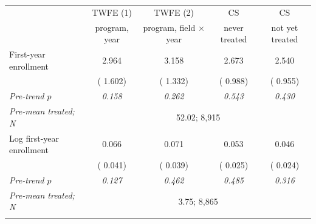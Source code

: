 \begin{tabular}{lcccc}
\toprule
 & TWFE (1) & TWFE (2) & CS & CS \\
 & program, year & program, field \(\times\) year & never treated & not yet treated \\
\midrule
First-year enrollment &   2.964\sym{*} &   3.158\sym{**} &   2.673\sym{***} &   2.540\sym{***} \\
 & ( 1.602) & ( 1.332) & ( 0.988) & ( 0.955) \\
\quad \textit{Pre-trend \(p\)} & \textit{0.158} & \textit{0.262} & \textit{0.543} & \textit{0.430} \\
\quad \textit{Pre-mean treated; N} & \multicolumn{4}{c}{\scriptsize   52.02;  8,915} \\
\addlinespace
Log first-year enrollment &   0.066 &   0.071\sym{*} &   0.053\sym{**} &   0.046\sym{*} \\
 & ( 0.041) & ( 0.039) & ( 0.025) & ( 0.024) \\
\quad \textit{Pre-trend \(p\)} & \textit{0.127} & \textit{0.462} & \textit{0.485} & \textit{0.316} \\
\quad \textit{Pre-mean treated; N} & \multicolumn{4}{c}{\scriptsize    3.75;  8,865} \\
\addlinespace
\bottomrule
\end{tabular}
